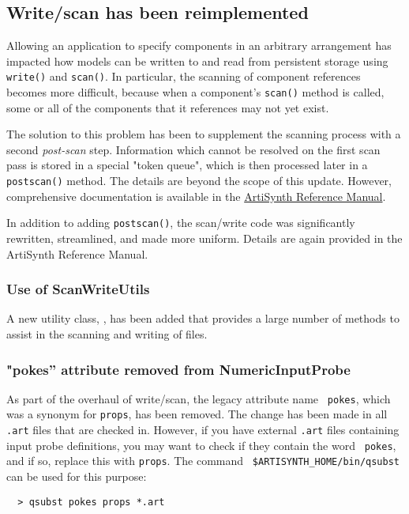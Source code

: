 \documentclass{article}
\begin{document}
\subsection*{Write/scan has been reimplemented}

Allowing an application to specify components in an arbitrary
arrangement has impacted how models can be written to and read from
persistent storage using {\tt write()} and {\tt scan()}. In
particular, the scanning of component references becomes more
difficult, because when a component's {\tt scan()} method is called,
some or all of the components that it references may not yet exist.

The solution to this problem has been to supplement the scanning
process with a second {\it post-scan} step. Information which cannot
be resolved on the first scan pass is stored in a special "token
queue", which is then processed later in a {\tt postscan()}
method. The details are beyond the scope of this update. However,
comprehensive documentation is available in the
\href{http://www.artisynth.org/doc/html/artisynth/artisynth.html}%
{ArtiSynth Reference Manual}.

In addition to adding {\tt postscan()}, the scan/write code was
significantly rewritten, streamlined, and made more uniform.  Details
are again provided in the ArtiSynth Reference Manual.

\subsubsection*{Use of ScanWriteUtils}

A new utility class, 
, has been added
that provides a large number of methods to assist in the scanning and
writing of files.

\subsubsection*{"pokes'' attribute removed from NumericInputProbe}

As part of the overhaul of write/scan, the legacy attribute name {\tt
pokes}, which was a synonym for {\tt props}, has been removed. The
change has been made in all {\tt .art} files that are checked in.
However, if you have external {\tt .art} files containing input probe
definitions, you may want to check if they contain the word {\tt
pokes}, and if so, replace this with {\tt props}. The command {\tt
\$ARTISYNTH\_HOME/bin/qsubst} can be used for this purpose:
\begin{lstlisting}
  > qsubst pokes props *.art
\end{lstlisting}
\end{document}
